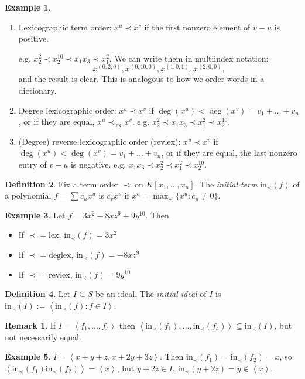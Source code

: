\documentclass[a4paper]{article}
\newcommand{\la}{\left\langle}
\newcommand{\ra}{\right\rangle}
\newcommand{\In}{\text{in}}
\theoremstyle{definition}
\newtheorem{defn}{Definition}[subsection]
\newtheorem{example}[defn]{Example}
\newtheorem*{remark}{Remark}
\begin{document}
\begin{example}
\begin{enumerate}
\item Lexicographic term order: $x^u\prec x^v$ if the first nonzero element of $v-u$ is positive.

e.g. $x_2^2\prec x_2^{10}\prec x_1x_3\prec x_1^2$. We can write them in multiindex notation:
\[
x^{(0,2,0)},x^{(0,10,0)},x^{(1,0,1)},x^{(2,0,0)},
\]
and the result is clear. This is analogous to how we order words in a dictionary.
\item Degree lexicographic order: $x^u\prec x^v$ if $\deg(x^u)<\deg(x^v)=v_1+\ldots +v_n$, or if they are equal, $x^u\prec_{\text{lex}} x^v$. e.g. $x_2^2\prec x_1x_3\prec x_1^2\prec x_2^{10}$.
\item (Degree) reverse lexicographic order (revlex): $x^u\prec x^v$ if $\deg(x^u)<\deg(x^v)=v_1+\ldots +v_n$, or if they are equal, the last nonzero entry of $v-u$ is negative. e.g. $x_1x_3\prec x_2^2\prec x_1^2\prec x_2^{10}$.
\end{enumerate}
\end{example}

\begin{defn}
Fix a term order $\prec$ on $K[x_1,\ldots,x_n]$. The \textit{initial term} $\In_\prec (f)$ of a polynomial $f=\sum c_u x^u$ is $c_v x^v$ if $x^v=\max_\prec \{x^u:c_u\neq 0\}$.
\end{defn}

\begin{example}
Let $f=3x^2-8xz^9+9y^{10}$. Then
\begin{itemize}
\item If $\prec=\text{lex}$, $\In_\prec(f)=3x^2$
\item If $\prec=\text{deglex}$, $\In_\prec(f)=-8xz^9$
\item If $\prec=\text{revlex}$, $\In_\prec(f)=9y^{10}$
\end{itemize}
\end{example}

\begin{defn}
Let $I\subseteq S$ be an ideal. The \textit{initial ideal} of $I$ is $\In_\prec (I) := \la \In_\prec(f):f\in I\ra$.  
\end{defn}
\begin{remark}
If $I=\la f_1,\ldots,f_s\ra$ then $\la \In_\prec (f_1),\ldots,\In_\prec (f_s)\ra \subseteq \In_\prec(I)$, but not necessarily equal.

\begin{example}
\label{example:GBcounterexample}
$I=\la x+y+z, x+2y+3z\ra$. Then $\In_\prec (f_1)=\In_\prec (f_2)=x$, so $\la \In_\prec (f_1) \In_\prec (f_2) \ra=\la x\ra$, but $y+2z\in I,\ \In_\prec(y+2z)=y\not\in \la x\ra$.
\end{example}
\end{remark}
\end{document}
